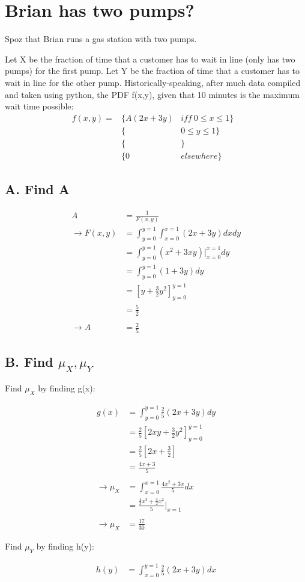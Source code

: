 \documentclass[]{article}
\begin{document}
			\pagebreak
	\section{Brian has two pumps?}
		
		Spoz that Brian runs a gas station with two pumps.
		
		Let X be the fraction of time that a customer has to wait in line (only has two pumps) for the first pump. Let Y be the fraction of time that a customer has to wait in line for the other pump. Historically-speaking, after much data compiled and taken using python, the PDF f(x,y), given that 10 minutes is the maximum wait time possible:
		\begin{align*}
			f(x,y) = &\{A(2x + 3y)  &iff\   0\leq x\leq 1\}& \\
			         &\{            &       0\leq y\leq 1\}& \\
			         &\{            &                    \}& \\
			         &\{0           &       elsewhere    \}&
		\end{align*}
		
		\subsection{A. Find A}
			\begin{align*}
				A      &= \frac{1}{F(x,y)} \\
			\to F(x,y) &= \int_{y=0}^{y=1}\int_{x=0}^{x=1}(2x+3y)dxdy \\
			           &= \int_{y=0}^{y=1}(x^2 + 3xy)|_{x=0}^{x=1}dy \\
			           &= \int_{y=0}^{y=1}(1 + 3y)dy \\
			           &= [y + \frac{3}{2}y^2]_{y=0}^{y=1} \\
			           &= \frac{5}{2} \\
			           \\
			\to A      &= \frac{2}{5}
			\end{align*}
		
	\pagebreak
		\subsection{B. Find $\mu_X, \mu_Y$}
			Find $\mu_X$ by finding g(x):
			
			\begin{align*}
				g(x)  &= \int_{y=0}^{y=1}\frac{2}{5}(2x+3y)dy \\
				      &= \frac{2}{5}[2xy + \frac{3}{2}y^2]_{y=0}^{y=1} \\
				      &= \frac{2}{5}[2x + \frac{3}{2}] \\
				      &= \frac{4x + 3}{5} \\\\
			\to \mu_X &= \int_{x=0}^{x=1}\frac{4x^2+3x}{5}dx \\
			          &= \frac{\frac{4}{3}x^3 + \frac{3}{2}x^2}{5}|_{x=1} \\\\
			\to \mu_X &= \frac{17}{30}
			\end{align*}
			
			Find $\mu_Y$ by finding h(y):
			
			\begin{align*}
				h(y)  &= \int_{x=0}^{y=1}\frac{2}{5}(2x+3y)dx
			\end{align*}
\end{document}
